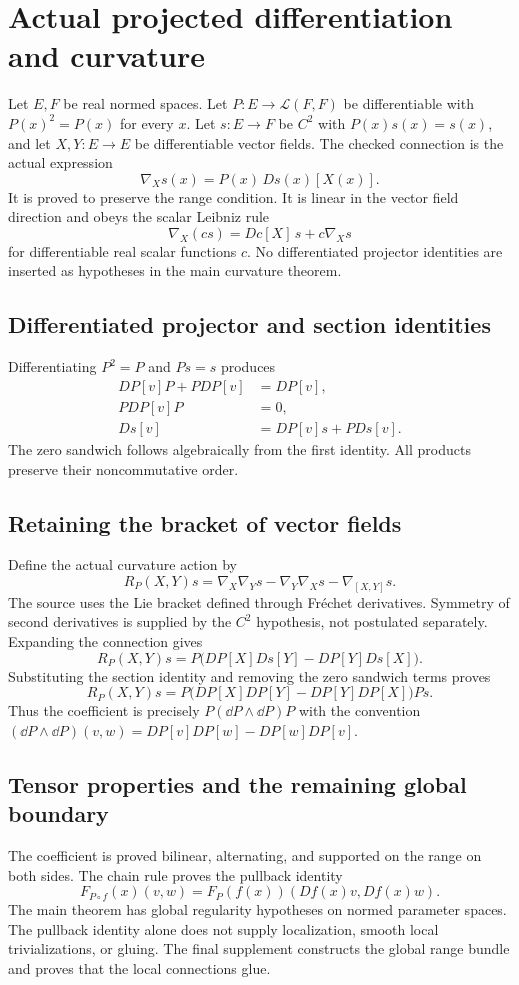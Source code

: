 \section{Actual projected differentiation and curvature}\label{supp4:section:002}
Let $E,F$ be real normed spaces. Let $P:E\to\mathcal L(F,F)$ be differentiable with $P(x)^2=P(x)$ for every $x$. Let $s:E\to F$ be $C^2$ with $P(x)s(x)=s(x)$, and let $X,Y:E\to E$ be differentiable vector fields. The checked connection is the actual expression
\[
\nabla_Xs(x)=P(x)\,Ds(x)[X(x)].
\]
It is proved to preserve the range condition. It is linear in the vector field direction and obeys the scalar Leibniz rule
\[
\nabla_X(cs)=Dc[X]\,s+c\nabla_Xs
\]
for differentiable real scalar functions $c$. No differentiated projector identities are inserted as hypotheses in the main curvature theorem.

\subsection{Differentiated projector and section identities}
Differentiating $P^2=P$ and $Ps=s$ produces
\begin{align*}
DP[v]P+PDP[v]&=DP[v],\\
PDP[v]P&=0,\\
Ds[v]&=DP[v]s+P Ds[v].
\end{align*}
The zero sandwich follows algebraically from the first identity. All products preserve their noncommutative order.

\subsection{Retaining the bracket of vector fields}
Define the actual curvature action by
\[
R_P(X,Y)s=\nabla_X\nabla_Ys-\nabla_Y\nabla_Xs-\nabla_{[X,Y]}s.
\]
The source uses the Lie bracket defined through Fr\'echet derivatives. Symmetry of second derivatives is supplied by the $C^2$ hypothesis, not postulated separately. Expanding the connection gives
\[
R_P(X,Y)s=P\bigl(DP[X]Ds[Y]-DP[Y]Ds[X]\bigr).
\]
Substituting the section identity and removing the zero sandwich terms proves
\[
\boxed{R_P(X,Y)s=P\bigl(DP[X]DP[Y]-DP[Y]DP[X]\bigr)P s.}
\]
Thus the coefficient is precisely $P(\dd P\wedge\dd P)P$ with the convention
$(\dd P\wedge\dd P)(v,w)=DP[v]DP[w]-DP[w]DP[v]$.

\subsection{Tensor properties and the remaining global boundary}
The coefficient is proved bilinear, alternating, and supported on the range on both sides. The chain rule proves the pullback identity
\[
F_{P\circ f}(x)(v,w)=F_P(f(x))(Df(x)v,Df(x)w).
\]
The main theorem has global regularity hypotheses on normed parameter spaces. The pullback identity alone does not supply localization, smooth local trivializations, or gluing. The final supplement constructs the global range bundle and proves that the local connections glue.



